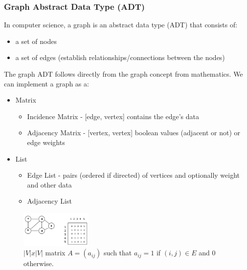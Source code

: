\documentclass[10pt,a4paper]{article}
\begin{document}
\subsubsection{Graph Abstract Data Type (ADT)}
In computer science, a graph is an abstract data type (ADT) that consists of:
\begin{itemize}
	\item a set of nodes
	\item a set of edges (establish relationships/connections between the nodes)
\end{itemize}
The graph ADT follows directly from the graph concept from mathematics. We can implement a graph as a:
\begin{itemize}
	\item Matrix
	\begin{itemize}
		\item Incidence Matrix - [edge, vertex] contains the edge's data
		\item Adjacency Matrix - [vertex, vertex] boolean values (adjacent or not) or edge weights
	\end{itemize}
	\item List
	\begin{itemize}
		\item Edge List - pairs (ordered if directed) of vertices and optionally weight and other data
		\item Adjacency List
	\end{itemize}
\end{itemize}
\begin{figure}[h!]
 \hfill \includegraphics[width=100pt]{images/adjacency-matrix.png}\hspace*{\fill}
  \caption{$|V|x|V|$ matrix $A=(a_{ij})$ such that $a_{ij}=1$ if $(i,j) \in E$ and $0$ otherwise.}
\end{figure} 
\end{document}
